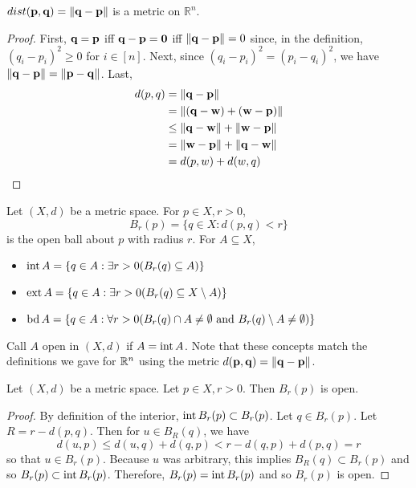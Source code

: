 \documentclass[letterpaper, twoside, 12pt]{book}
\begin{document}
\begin{theorem}[12.2]
  \(dist(\mathbf p,\mathbf q)=\|\mathbf q-\mathbf p\|\) is
  a metric on \(\mathbb R^n\).
\end{theorem}

\begin{proof}
    First, \(\mathbf q = \mathbf p\) iff \(\mathbf q - \mathbf p = \mathbf 0\) 
    iff \(\|\mathbf q - \mathbf p\| = 0\) since, in the definition,
    \((q_i - p_i)^2 \geq 0\) for \(i \in [n]\). Next, since 
    \((q_i - p_i)^2 = (p_i - q_i)^2\), we have 
    \(\|\mathbf q - \mathbf p\| = \|\mathbf p - \mathbf q\|\). Last,
    \begin{align*}
        d(p, q) &= \|\mathbf q - \mathbf p\| \\
        &= \|(\mathbf q - \mathbf w) + (\mathbf w - \mathbf p)\| \\
        &\leq \|\mathbf q - \mathbf w\| + \|\mathbf w - \mathbf p\| \\
        &= \|\mathbf w - \mathbf p\| + \|\mathbf q - \mathbf w\| \\
        &= d(p, w) + d(w, q) \\
    \end{align*}
\end{proof}

\begin{definition}
  Let \((X,d)\) be a metric space. For \(p\in X,r>0\),
    \[ B_r(p)=\{q\in X:d(p,q)<r\} \]
  is the open ball about \(p\) with radius \(r\). For \(A\subseteq X\),
  \begin{itemize}
    \item \(\operatorname{int} A = \{q\in A:\exists r>0(B_r(q)\subseteq A)\}\)
    \item \(\operatorname{ext} A = \{q\in A:\exists r>0(B_r(q)\subseteq X\setminus A)\}\)
    \item \(\operatorname{bd} A = \{q\in A:\forall r>0(B_r(q)\cap A\not=\emptyset\text{ and }B_r(q)\setminus A\not=\emptyset)\}\)
  \end{itemize}
  Call \(A\) open in \((X,d)\) if \(A=\operatorname{int} A\).
  Note that these concepts match the definitions we gave for \(\mathbb R^n\)
  using the metric \(d(\mathbf p,\mathbf q)=\|\mathbf q-\mathbf p\|\).
\end{definition}

\begin{theorem}[12.8]
  Let \((X,d)\) be a metric space. Let \(p\in X,r>0\). Then
  \(B_r(p)\) is open.
\end{theorem}

\begin{proof}
    By definition of the interior, \(\operatorname{int} B_r(p) \subset B_r(p)\). Let
    \(q \in B_r(p)\). Let \(R = r - d(p, q)\). Then for \(u \in B_R(q)\), we
    have 
    \[ d(u, p) \leq d(u, q) + d(q, p) < r - d(q, p) + d(p, q) = r \]
    so that \(u \in B_r(p)\). Because \(u\) was arbitrary, this implies
    \(B_R(q) \subset B_r(p)\) and so \(B_r(p) \subset \operatorname{int} B_r(p)\).
    Therefore, \(B_r(p) = \operatorname{int} B_r(p)\) and so \(B_r(p)\) is open. 
\end{proof}
\end{document}
